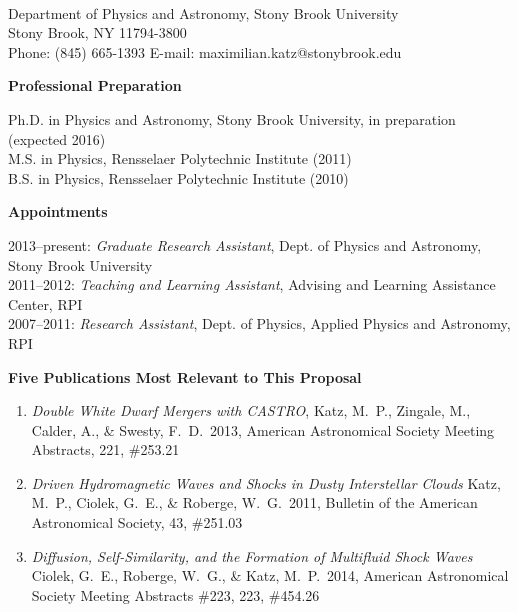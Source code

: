 \documentclass[11pt,letterpaper,english]{article}
\begin{document}
\setlength{\parindent}{0in} %

\pagestyle{fancy}   \renewcommand{%
\headrulewidth}{0.0pt}



\\
Department of Physics and Astronomy, Stony Brook University\\
Stony Brook, NY 11794-3800\\
Phone: (845) 665-1393 \hspace{0.1in} E-mail: maximilian.katz@stonybrook.edu \smallskip

\begin{flushleft} {\bf Professional Preparation}
{\parindent 16pt

Ph.D. in Physics and Astronomy, Stony Brook University, in preparation (expected 2016)\\ 
M.S. in Physics, Rensselaer Polytechnic Institute (2011) \\ 
B.S. in Physics, Rensselaer Polytechnic Institute (2010) \\ 
}

\vspace{.04in}
{\bf Appointments}
{\parindent 16pt

2013--present: \textit{Graduate Research Assistant}, Dept. of Physics and Astronomy, Stony Brook University \\ 
2011--2012: \textit{Teaching and Learning Assistant}, Advising and Learning Assistance Center, RPI \\
2007--2011: \textit{Research Assistant}, Dept. of Physics, Applied Physics and Astronomy, RPI \\
}

\vspace{.04in}
{\bf Five Publications Most Relevant to This Proposal}
\vspace{-6pt}
\begin{enumerate} \itemsep1pt \parskip0pt 
\item {\it Double White Dwarf Mergers with CASTRO}, Katz, M.~P., Zingale, M., Calder, A., \& Swesty, F.~D.\ 2013, American Astronomical Society Meeting Abstracts, 221, \#253.21 \\ 
\item {\it Driven Hydromagnetic Waves and Shocks in Dusty Interstellar Clouds} Katz, M.~P., Ciolek, G.~E., \& Roberge, W.~G.\ 2011, Bulletin of the American Astronomical Society, 43, \#251.03 \\ 
\item {\it Diffusion, Self-Similarity, and the Formation of Multifluid Shock Waves} Ciolek, G.~E., Roberge, W.~G., \& Katz, M.~P.\ 2014, American Astronomical Society Meeting Abstracts \#223, 223, \#454.26 \\
\end{enumerate} 


\end{flushleft}
\end{document}

